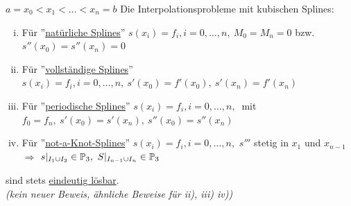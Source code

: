 \begin{theorem}
    \(a=x_0<x_1<\dots<x_n=b\) Die Interpolationsprobleme mit kubischen Splines:
    \begin{enumerate}[i)]
        \item Für ''\underline{natürliche Splines}'' \(s(x_i)=f_i, i=0,\dots,n,\ M_0=M_n=0\) bzw. \(s''(x_0)=s''(x_n)=0\)
        \item Für ''\underline{vollständige Splines}'' \(s(x_i)=f_i, i=0,\dots,n,\ s'(x_0)=f'(x_0),\ s'(x_n)=f'(x_n)\) 
        \item Für ''\underline{periodische Splines}'' \(s(x_i)=f_i, i=0,\dots,n,\ \) mit \(f_0=f_n,\ s'(x_0)=s'(x_n),\ 
        s''(x_0)=s''(x_n)\)
        \item Für ''\underline{not-a-Knot-Splines}'' \(s(x_i)=f_i, i=0,\dots,n,\) \(s'''\) stetig in \(x_1\) und 
        \(x_{n-1}\) \(\Rightarrow\) \(s\vert_{I_1\cup I_2}\in\Pol_3,\ S\vert_{I_{n-1}\cup I_n}\in\Pol_3\)
    \end{enumerate}
    sind stets \underline{eindeutig lösbar}.\\
    \textit{(kein neuer Beweis, ähnliche Beweise für ii), iii) iv))}
\end{theorem}

